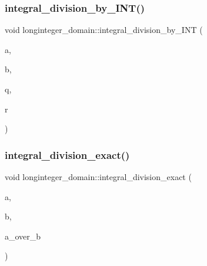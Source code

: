 \mbox{\label{classlonginteger__domain_a5184e0be0edaa5f5de9f332b033d66d1}} 
\subsubsection{\texorpdfstring{integral\+\_\+division\+\_\+by\+\_\+\+I\+N\+T()}{integral\_division\_by\_INT()}}
{\footnotesize\ttfamily void longinteger\+\_\+domain\+::integral\+\_\+division\+\_\+by\+\_\+\+I\+NT (\begin{DoxyParamCaption}\item[{\mbox{\hyperlink{classlonginteger__object}{longinteger\+\_\+object}} \&}]{a,  }\item[{\mbox{\hyperlink{galois_8h_a09fddde158a3a20bd2dcadb609de11dc}{I\+NT}}}]{b,  }\item[{\mbox{\hyperlink{classlonginteger__object}{longinteger\+\_\+object}} \&}]{q,  }\item[{\mbox{\hyperlink{galois_8h_a09fddde158a3a20bd2dcadb609de11dc}{I\+NT}} \&}]{r }\end{DoxyParamCaption})}

\mbox{\label{classlonginteger__domain_a76549e2ed11fd120ccb7d928b31d0ac7}} 
\subsubsection{\texorpdfstring{integral\+\_\+division\+\_\+exact()}{integral\_division\_exact()}}
{\footnotesize\ttfamily void longinteger\+\_\+domain\+::integral\+\_\+division\+\_\+exact (\begin{DoxyParamCaption}\item[{\mbox{\hyperlink{classlonginteger__object}{longinteger\+\_\+object}} \&}]{a,  }\item[{\mbox{\hyperlink{classlonginteger__object}{longinteger\+\_\+object}} \&}]{b,  }\item[{\mbox{\hyperlink{classlonginteger__object}{longinteger\+\_\+object}} \&}]{a\+\_\+over\+\_\+b }\end{DoxyParamCaption})}

